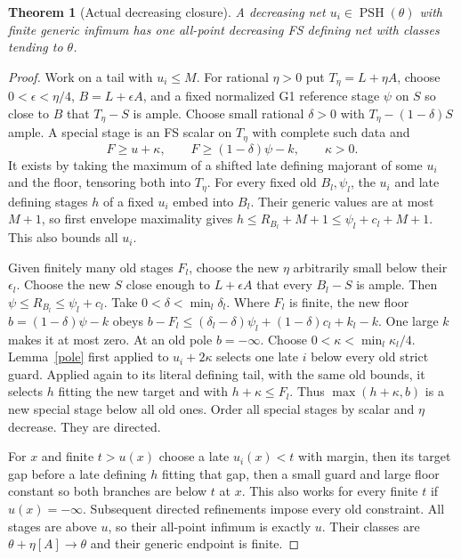 \documentclass[10pt]{article}
\newtheorem{theorem}{Theorem}[section]
\newcommand{\PSH}{\operatorname{PSH}}
\begin{document}
\begin{theorem}[Actual decreasing closure]\label{closure}
A decreasing net $u_i\in\PSH(\theta)$ with finite generic infimum
has one all-point decreasing FS defining net with classes tending to
$\theta$.
\end{theorem}
\begin{proof}
Work on a tail with $u_i\leq M$. For rational $\eta>0$ put
$T_\eta=L+\eta A$, choose $0<\epsilon<\eta/4$, $B=L+\epsilon A$,
and a fixed normalized G1 reference stage $\psi$ on $S$ so close to
$B$ that $T_\eta-S$ is ample. Choose small rational $\delta>0$ with
$T_\eta-(1-\delta)S$ ample. A special stage is an FS scalar on
$T_\eta$ with complete such data and
\[
 F\geq u+\kappa,\qquad F\geq(1-\delta)\psi-k,
 \qquad\kappa>0.
 \tag{3.1}
\]
It exists by taking the maximum of a shifted late defining majorant
of some $u_i$ and the floor, tensoring both into $T_\eta$.
For every fixed old $B_l,\psi_l$, the $u_i$ and late defining stages
$h$ of a fixed $u_i$ embed into $B_l$. Their generic values are at
most $M+1$, so first envelope maximality gives
$h\leq R_{B_l}+M+1\leq\psi_l+c_l+M+1$. This also bounds all $u_i$.

Given finitely many old stages $F_l$, choose the new $\eta$ arbitrarily
small below their $\epsilon_l$. Choose the new $S$ close enough to
$L+\epsilon A$ that every $B_l-S$ is ample. Then
$\psi\leq R_{B_l}\leq\psi_l+c_l$. Take
$0<\delta<\min_l\delta_l$. Where $F_l$ is finite, the new floor
$b=(1-\delta)\psi-k$ obeys
$b-F_l\leq(\delta_l-\delta)\psi_l+(1-\delta)c_l+k_l-k$.
One large $k$ makes it at most zero. At an old pole $b=-\infty$.
Choose $0<\kappa<\min_l\kappa_l/4$. Lemma~\ref{pole} first applied
to $u_i+2\kappa$ selects one late $i$ below every old strict guard.
Applied again to its literal defining tail, with the same old bounds,
it selects $h$ fitting the new target and with $h+\kappa\leq F_l$.
Thus $\max(h+\kappa,b)$ is a new special stage below all old ones.
Order all special stages by scalar and $\eta$ decrease. They are directed.

For $x$ and finite $t>u(x)$ choose a late $u_i(x)<t$ with margin,
then its target gap before a late defining $h$ fitting that gap, then
a small guard and large floor constant so both branches are below $t$
at $x$. This also works for every finite $t$ if $u(x)=-\infty$.
Subsequent directed refinements impose every old constraint. All stages
are above $u$, so their all-point infimum is exactly $u$. Their classes
are $\theta+\eta[A]\to\theta$ and their generic endpoint is finite.
\end{proof}
\end{document}
